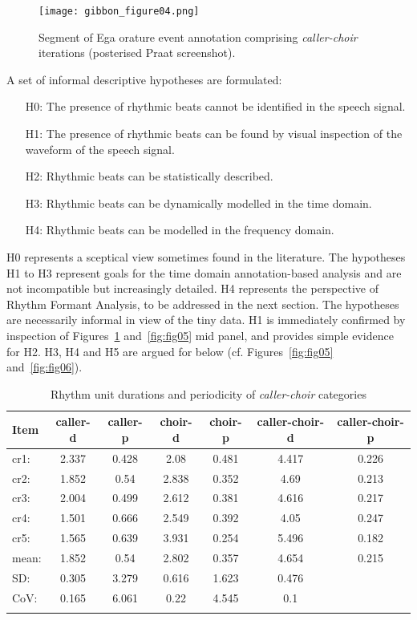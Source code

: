 \documentclass[output=paper,colorlinks,citecolor=brown]{langscibook}
\begin{document}
\begin{figure}
\texttt{[image: gibbon\_figure04.png]}
\caption{\label{fig:fig04}Segment of Ega orature event annotation comprising \textit{caller-choir} iterations (posterised Praat screenshot).}
\end{figure}

A set of informal descriptive hypotheses are formulated:

\begin{itemize}
    \item[H0:] The presence of rhythmic beats cannot be identified in the speech signal.
    \item[H1:] The presence of rhythmic beats can be found by visual inspection of the waveform of the speech signal.
    \item[H2:] Rhythmic beats can be statistically described.
    \item[H3:] Rhythmic beats can be dynamically modelled in the time domain.
    \item[H4:] Rhythmic beats can be modelled in the frequency domain.
\end{itemize}

H0 represents a sceptical view sometimes found in the literature. The hypotheses H1 to H3 represent goals for the time domain annotation-based analysis and are not incompatible but increasingly detailed. H4 represents the perspective of Rhythm Formant Analysis, to be addressed in the next section. The hypotheses are necessarily informal in view of the tiny data. H1 is immediately confirmed by inspection of Figures~\ref{fig:fig04} and~\ref{fig:fig05} mid panel, and  provides simple evidence for H2. H3, H4 and H5 are argued for below (cf. Figures~\ref{fig:fig05} and~\ref{fig:fig06}).

\begin{table}
\small
\caption{Rhythm unit durations and periodicity of \textit{caller-choir} categories}
\label{table:table01}
\begin{tabular}{l *6{S[table-format=1.3]}}
\lsptoprule
Item	& {caller-d} & {caller-p} & {choir-d} & {choir-p} & {caller-choir-d} & {caller-choir-p}\\\midrule
cr1:	& 2.337	& 0.428	& 2.08	& 0.481	& 4.417	& 0.226\\
cr2:	& 1.852	& 0.54	& 2.838	& 0.352	& 4.69	& 0.213\\
cr3:	& 2.004	& 0.499	& 2.612	& 0.381	& 4.616	& 0.217\\
cr4:	& 1.501	& 0.666	& 2.549	& 0.392	& 4.05	& 0.247\\
cr5:	& 1.565	& 0.639	& 3.931	& 0.254	& 5.496	& 0.182\\\addlinespace
mean:	& 1.852	& 0.54	& 2.802	& 0.357	& 4.654	& 0.215\\
SD:	    & 0.305	& 3.279	& 0.616	& 1.623	& 0.476	& \\
CoV:	& 0.165	& 6.061	& 0.22	& 4.545	& 0.1	& \\
\lsptoprule
\end{tabular}
\end{table}
\end{document}
